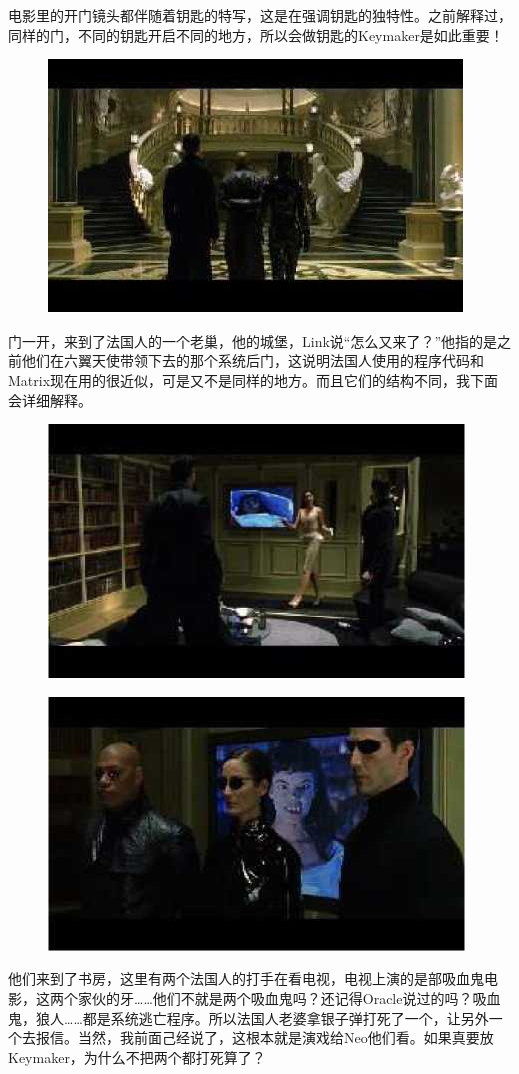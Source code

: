 \documentclass[UTF8]{ctexart}
\begin{document}
电影里的开门镜头都伴随着钥匙的特写，这是在强调钥匙的独特性。之前解释过，同样的门，不同的钥匙开启不同的地方，所以会做钥匙的Keymaker是如此重要！

\begin{figure}[htb]
\centering
\includegraphics[width=0.5\linewidth]{fig/read_reloaded-111-1}
\end{figure}

门一开，来到了法国人的一个老巢，他的城堡，Link说“怎么又来了？”他指的是之前他们在六翼天使带领下去的那个系统后门，这说明法国人使用的程序代码和Matrix现在用的很近似，可是又不是同样的地方。而且它们的结构不同，我下面会详细解释。

\begin{figure}[htb]
\centering
\includegraphics[width=0.5\linewidth]{fig/read_reloaded-112}
\end{figure}

\begin{figure}[!htb]
\centering
\includegraphics[width=0.5\linewidth]{fig/read_reloaded-113}
\end{figure}

他们来到了书房，这里有两个法国人的打手在看电视，电视上演的是部吸血鬼电影，这两个家伙的牙……他们不就是两个吸血鬼吗？还记得Oracle说过的吗？吸血鬼，狼人……都是系统逃亡程序。所以法国人老婆拿银子弹打死了一个，让另外一个去报信。当然，我前面己经说了，这根本就是演戏给Neo他们看。如果真要放Keymaker，为什么不把两个都打死算了？
\end{document}
